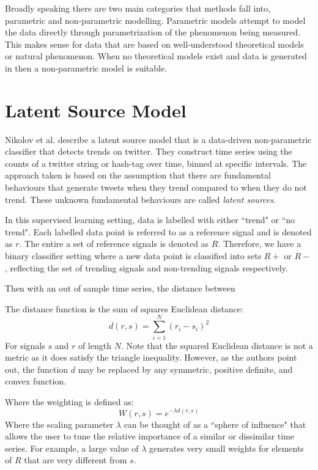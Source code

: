 Broadly speaking there are two main categories that methods fall into, parametric and non-parametric modelling. Parametric models attempt to model the data directly through parametrization of the phenomenon being measured. This makes sense for data that are based on well-understood theoretical models or natural phenomenon. When no theoretical models exist and data is generated in then a non-parametric model is suitable.

\section{Latent Source Model}

Nikolov et al.\cite{nikolov2012trend} describe a latent source model that is a data-driven non-parametric classifier that detects trends on twitter. They construct time series using the counts of a twitter string or hash-tag over time, binned at specific intervals. The approach taken is based on the assumption that there are fundamental behaviours that generate tweets when they trend compared to when they do not trend. These unknown fundamental behaviours are called \textit{latent sources}. 

In this supervised learning setting, data is labelled with either ``trend" or ``no trend". Each labelled data point is referred to as a reference signal and is denoted as $r$. The entire a set of reference signals is denoted as $R$. Therefore, we have a binary classifier setting where a new data point is classified into sets $R+$ or $R-$, reflecting the set of trending signals and non-trending signals respectively. 

Then with an out of sample time series, the distance between  

The distance function is the sum of squares Euclidean distance:
\begin{equation}
d(r,s) = \sum_{i=1}^N (r_i - s_i)^2 
\end{equation}
For signals $s$ and $r$ of length $N$. Note that the squared Euclidean distance is not a metric as it does satisfy the triangle inequality. However, as the authors point out,  the function $d$ may be replaced by any symmetric, positive definite, and convex function. 

Where the weighting is defined as:
\begin{equation}
W(r,s) = e^{-\lambda d(r,s)}
\end{equation}
Where the scaling parameter $\lambda$ can be thought of as a ``sphere of influence" that allows the user to tune the relative importance of a similar or dissimilar time series. For example, a large value of $\lambda$ generates very small weights for elements of $R$ that are very different from $s$.

